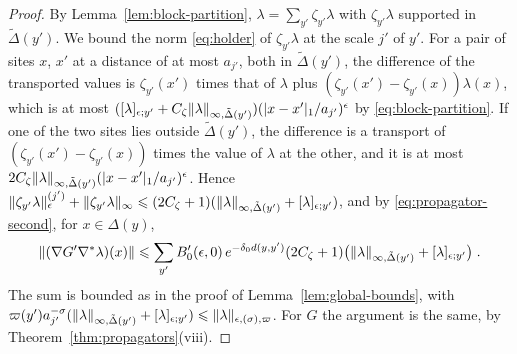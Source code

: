 \documentclass[11pt]{preprint}
\DeclarePairedDelimiter{\abs}{\lvert}{\rvert}
\DeclarePairedDelimiter{\norm}{\lVert}{\rVert}
\numberwithin{equation}{section}
\begin{document}
\begin{proof}
By Lemma~\ref{lem:block-partition}, $\lambda = \sum_{y'}\zeta_{y'}\lambda$ with $\zeta_{y'}\lambda$ supported in $\tilde\Delta(y')$. We bound the norm \eqref{eq:holder} of $\zeta_{y'}\lambda$ at the scale $j'$ of $y'$. For a pair of sites $x$, $x'$ at a distance of at most $a_{j'}$, both in $\tilde\Delta(y')$, the difference of the transported values is $\zeta_{y'}(x')$ times that of $\lambda$ plus $(\zeta_{y'}(x') - \zeta_{y'}(x))\lambda(x)$, which is at most $([\lambda]_{\epsilon;y'} + C_\zeta\norm\lambda_{\infty,\tilde\Delta(y')})(\abs{x - x'}_1/a_{j'})^\epsilon$ by \eqref{eq:block-partition}. If one of the two sites lies outside $\tilde\Delta(y')$, the difference is a transport of $(\zeta_{y'}(x') - \zeta_{y'}(x))$ times the value of $\lambda$ at the other, and it is at most $2C_\zeta\norm\lambda_{\infty,\tilde\Delta(y')}(\abs{x - x'}_1/a_{j'})^\epsilon$. Hence $\norm{\zeta_{y'}\lambda}^{(j')}_\epsilon + \norm{\zeta_{y'}\lambda}_\infty \leqslant (2C_\zeta + 1)(\norm\lambda_{\infty,\tilde\Delta(y')} + [\lambda]_{\epsilon;y'})$, and by \eqref{eq:propagator-second}, for $x \in \Delta(y)$,
\[
    \norm{(\nabla G'\nabla^*\lambda)(x)} \leqslant \sum_{y'}B'_0(\epsilon, 0)\,e^{-\delta_0d(y, y')}(2C_\zeta + 1)\bigl(\norm\lambda_{\infty,\tilde\Delta(y')} + [\lambda]_{\epsilon;y'}\bigr)\;.
\]
The sum is bounded as in the proof of Lemma~\ref{lem:global-bounds}, with $\varpi(y')a_{j'}^{-\sigma}(\norm\lambda_{\infty,\tilde\Delta(y')} + [\lambda]_{\epsilon;y'}) \leqslant \norm\lambda_{\epsilon,(\sigma),\varpi}$. For $G$ the argument is the same, by Theorem~\ref{thm:propagators}(viii).


\end{proof}
\end{document}
